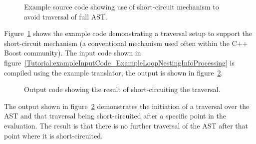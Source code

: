 \begin{figure}[!h]
{\indent
{\mySmallFontSize

\begin{latexonly}
   
\end{latexonly}

\begin{htmlonly}
   
\end{htmlonly}

}
}
\caption{Example source code showing use of short-circuit mechanism to avoid traversal of full AST.}
\label{Tutorial:exampleTraversalShortCircuit}
\end{figure}

Figure~\ref{Tutorial:exampleTraversalShortCircuit} shows the example code demonstrating a
traversal setup to support the short-circuit mechanism (a conventional mechanism used
often within the C++ Boost community). The input code shown in 
figure~\ref{Tutorial:exampleInputCode_ExampleLoopNestingInfoProcessing}
is compiled using the example translator, the output is shown in 
figure~\ref{Tutorial:exampleOutput_traversalShortCircuit}.

\begin{figure}[!h]
{\indent
{\mySmallFontSize

\begin{latexonly}
   
\end{latexonly}

\begin{htmlonly}
   
\end{htmlonly}

}
}
\caption{Output code showing the result of short-circuiting the traversal.}
\label{Tutorial:exampleOutput_traversalShortCircuit}
\end{figure}

   The output shown in figure~\ref{Tutorial:exampleOutput_traversalShortCircuit}
demonstrates the initiation of a traversal over the AST and that traversal
being short-circuited after a specific point in the evaluation.  The result is
that there is no further traversal of the AST after that point where it is
short-circuited.




